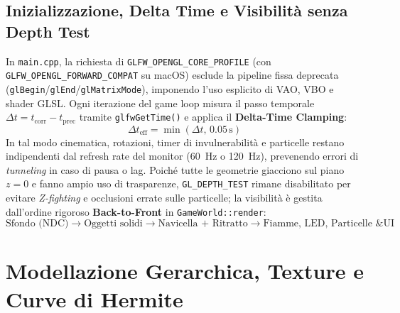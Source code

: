 \documentclass[11pt,a4paper]{article}
\begin{document}
\subsection{Inizializzazione, Delta Time e Visibilità senza Depth Test}
In \texttt{main.cpp}, la richiesta di \texttt{GLFW\_OPENGL\_CORE\_PROFILE} (con \texttt{GLFW\_OPENGL\_FORWARD\_COMPAT} su macOS) esclude la pipeline fissa deprecata (\texttt{glBegin}/\texttt{glEnd}/\texttt{glMatrixMode}), imponendo l'uso esplicito di VAO, VBO e shader GLSL. Ogni iterazione del game loop misura il passo temporale $\Delta t = t_{\text{corr}} - t_{\text{prec}}$ tramite \texttt{glfwGetTime()} e applica il \textbf{Delta-Time Clamping}:
\[
\Delta t_{\text{eff}} = \min(\Delta t,\, 0.05\,\text{s})
\]
In tal modo cinematica, rotazioni, timer di invulnerabilità e particelle restano indipendenti dal refresh rate del monitor (60~Hz o 120~Hz), prevenendo errori di \textit{tunneling} in caso di pausa o lag. Poiché tutte le geometrie giacciono sul piano $z=0$ e fanno ampio uso di trasparenze, \texttt{GL\_DEPTH\_TEST} rimane disabilitato per evitare \textit{Z-fighting} e occlusioni errate sulle particelle; la visibilità è gestita dall'ordine rigoroso \textbf{Back-to-Front} in \texttt{GameWorld::render}:
\[
\text{Sfondo (NDC)} \longrightarrow \text{Oggetti solidi} \longrightarrow \text{Navicella + Ritratto} \longrightarrow \text{Fiamme, LED, Particelle \& UI}
\]

\section{Modellazione Gerarchica, Texture e Curve di Hermite}
\end{document}
